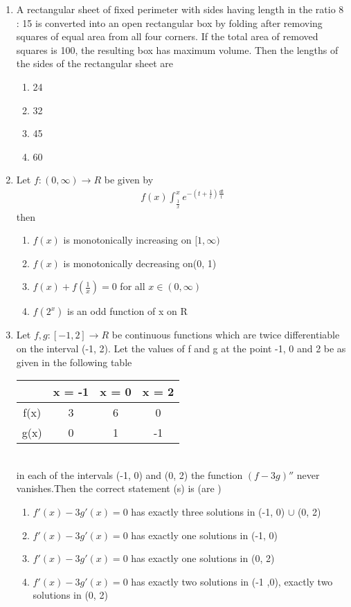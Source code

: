 \begin{enumerate}[label=\arabic*.,ref=\thesubsection.\theenumi]
\item A rectangular sheet of fixed perimeter with sides having length in the ratio 8 : 15 is converted into an open rectangular box by folding after removing squares of equal area from all four corners. If the total area of removed squares is 100, the resulting box has maximum volume. Then the lengths of the sides of the rectangular sheet are
\begin{enumerate}
\item 24
\item 32
\item 45
\item 60
\end{enumerate}

\item Let $f: (0, \infty) \to R$ be given by 
\begin{align*}
f(x)\int_{\frac{1}{x}}^{x} e^{-(t + \frac{1}{t})\frac{dt}{t}}
\end{align*}
then 
\begin{enumerate}
\item $f(x)$ is monotonically increasing on $[1, \infty)$
\item $f(x)$ is monotonically decreasing on(0, 1)
\item $f(x) + f(\frac{1}{x}) = 0$ for all $x \in (0, \infty)$
\item $f(2^x)$ is an odd function of x on R
\end{enumerate}

\item Let $f, g: [-1, 2] \to R$ be continuous functions which are twice differentiable on the interval (-1, 2). Let the values of f and g at the point -1, 0 and 2 be as given in the following table

\begin{tabular}{|c| c| c| c|} 
 \hline
  & x = -1 & x = 0 & x = 2 \\ 
 \hline
 f(x) & 3 & 6 & 0 \\ 
 \hline
 g(x) & 0 & 1 & -1 \\
 \hline
\end{tabular}\\

in each of the intervals (-1, 0) and (0, 2) the function $(f-3g)''$ never vanishes.Then the correct statement (s) is 
(are )
\begin{enumerate}
\item $f'(x) - 3g'(x) = 0$ has exactly three solutions in (-1, 0) $\cup$ (0, 2)
\item $f'(x) - 3g'(x) = 0$ has exactly one solutions in (-1, 0)
\item $f'(x) - 3g'(x) = 0$ has exactly one solutions in (0, 2)
\item $f'(x) - 3g'(x) = 0$ has exactly two solutions in (-1 ,0), exactly two solutions in (0, 2)
\end{enumerate}


\end{enumerate}
